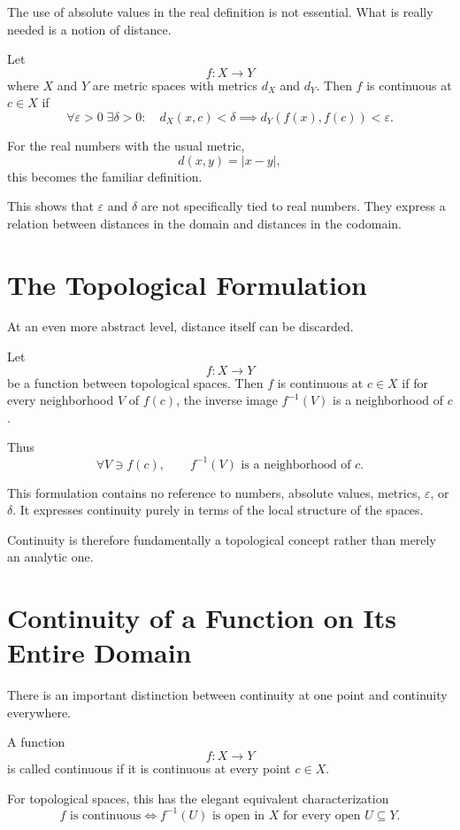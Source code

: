 \documentclass{essay}
\begin{document}
The use of absolute values in the real definition is not essential. What is really needed is a notion of distance.

Let
\[ f:X\to Y \]
where \(X\) and \(Y\) are metric spaces with metrics \(d_{X}\) and \(d_{Y}\). Then \(f\) is continuous at \(c\in X\) if
\[ \boxed{ \forall\varepsilon>0\;\exists\delta>0: \quad d_{X}(x,c)<\delta \implies d_{Y}(f(x),f(c))<\varepsilon. } \]

For the real numbers with the usual metric,
\[ d(x,y)=|x-y|, \]
this becomes the familiar definition.

This shows that \(\varepsilon\) and \(\delta\) are not specifically tied to real numbers. They express a relation between distances in the domain and distances in the codomain.

\section{The Topological Formulation}

At an even more abstract level, distance itself can be discarded.

Let
\[ f:X\to Y \]
be a function between topological spaces. Then \(f\) is continuous at \(c\in X\) if for every neighborhood \(V\) of \(f(c)\), the inverse image \(f^{-1}(V)\) is a neighborhood of \(c\).

Thus
\[ \boxed{ \forall V\ni f(c), \qquad f^{-1}(V)\text{ is a neighborhood of }c. } \]

This formulation contains no reference to numbers, absolute values, metrics, \(\varepsilon\), or \(\delta\). It expresses continuity purely in terms of the local structure of the spaces.

Continuity is therefore fundamentally a topological concept rather than merely an analytic one.

\section{Continuity of a Function on Its Entire Domain}

There is an important distinction between continuity at one point and continuity everywhere.

A function
\[ f:X\to Y \]
is called continuous if it is continuous at every point \(c\in X\).

For topological spaces, this has the elegant equivalent characterization
\[ \boxed{ f\text{ is continuous} \iff f^{-1}(U)\text{ is open in }X \text{ for every open }U\subseteq Y. } \]
\end{document}
